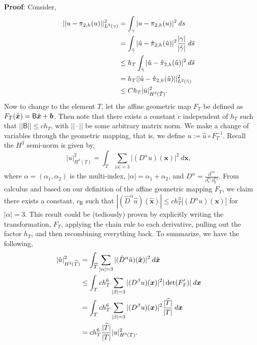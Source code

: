 \documentclass[11pt]{article}
\newcommand{\bs}{\boldsymbol}
\begin{document}
{\bf Proof}: Consider,
\begin{align*}
    ||u - \pi_{2,h}(u)||_{L^2(\gamma)}^2 &= \int_\gamma |u - \pi_{2,h}(u)|^2 \: ds \\
    &= \int_{\Hat{\gamma}} |\Hat{u} - \Hat{\pi}_{2,h}(\Hat{u})|^2 \frac{|\gamma|}{|\Hat{\gamma}|} \: d\Hat{s} \\
    &\leq h_T \int_{\Hat{\gamma}} |\Hat{u} - \Hat{\pi}_{2,h}(\Hat{u})|^2 \: d\Hat{s} \\
    &= h_T ||\Hat{u} - \Hat{\pi}_{2,h}(\Hat{u})||^2_{L^2(\Hat{\gamma})} \\
    &\leq Ch_T | \Hat{u}|^2_{H^3(\Hat{T})}.
\end{align*}
Now to change to the element $T$, let the affine geometric map $F_T$ be defined as $F_T(\Hat{\bs{x}}) = \mathsf{B}\Hat{\bs{x}} + \bs{b}$. 
Then note that there exists a constant $c$ independent of $h_T$ such that $||\mathsf{B}|| \leq ch_T$, with $||\cdot||$ be some arbitrary matrix norm.
We make a change of variables through the geometric mapping, that is, we define $u := \hat{u}\circ F_T^{-1}$.
Recall the $H^3$ semi-norm is given by,
\begin{equation}
	|u|^2_{H^3(T)} = \int_T \sum_{|\alpha|=3} \Big| (D^\alpha u)(\bs{x})  \Big|^2 \: d\bs{x},
\end{equation}
where $\alpha = (\alpha_1, \alpha_2)$ is the multi-index, $|\alpha| = \alpha_1 + \alpha_2$, and $D^\alpha = \frac{\partial^{|\alpha|}}{\partial_x^{\alpha_1} \partial_y^{\alpha_2}}$.
From calculus and based on our definition of the affine geometric mapping $F_T$, we claim there exists a constant, $c_{\mathsf{B}}$ such that $|(\widehat{D}^\alpha \hat{u})(\hat{\bs{x}})| \leq ch_T^3 |(D^\alpha u)(\bs{x})|$ for $|\alpha| = 3$.
This result could be (tediously) proven by explicitly writing the transformation, $F_T$, applying the chain rule to each derivative, pulling out the factor $h_T$, and then recombining everything back.
To summarize, we have the following,
\begin{align*}
	|\hat{u}|^2_{H^3(\widehat{T})} &= \int_{\widehat{T}}\sum_{|\alpha| = 3} |(\Hat{D}^\alpha \Hat{u})(\Hat{\bs{x}})|^2 \: d\hat{\bs{x}} \\
	&\leq \int_T ch_T^6\sum_{|\beta| = 3} |(D^\beta u)(\bs{x})|^2 |\det(F'_T)| \: d\bs{x} \\
	&= \int_T ch_T^6\sum_{|\beta| = 3} |(D^\beta u)(\bs{x})|^2 \frac{|\widehat{T}|}{|T|} \: d\bs{x} \\
	&= ch_T^6 \frac{|\widehat{T}|}{|T|} |u|^2_{H^3(T)}.
\end{align*}
\end{document}
